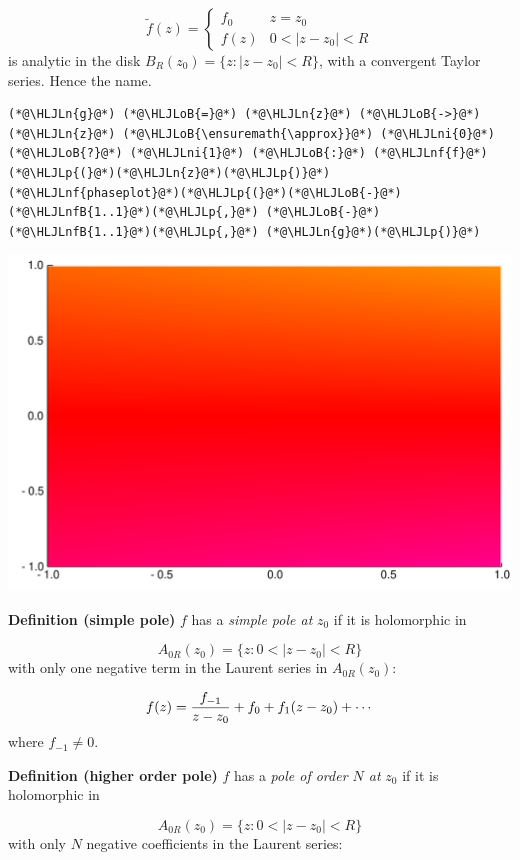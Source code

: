\documentclass[12pt,a4paper]{article}
\newcommand{\HLJLn}[1]{#1}
\newcommand{\HLJLnf}[1]{\textcolor[RGB]{66,102,213}{#1}}
\newcommand{\HLJLnfB}[1]{\textcolor[RGB]{59,151,46}{#1}}
\newcommand{\HLJLni}[1]{\textcolor[RGB]{59,151,46}{#1}}
\newcommand{\HLJLoB}[1]{\textcolor[RGB]{102,102,102}{\textbf{#1}}}
\newcommand{\HLJLp}[1]{#1}
\begin{document}
\[
\tilde f(z) = \begin{cases} f_0 & z = z_0 \\
                                f(z) & 0 < |z-z_0| < R
                                \end{cases}
\]
is analytic in the disk $B_R(z_0) = \{ z : |z-z_0| < R \}$, with a convergent Taylor series. Hence the name.


\begin{lstlisting}
(*@\HLJLn{g}@*) (*@\HLJLoB{=}@*) (*@\HLJLn{z}@*) (*@\HLJLoB{->}@*) (*@\HLJLn{z}@*) (*@\HLJLoB{\ensuremath{\approx}}@*) (*@\HLJLni{0}@*) (*@\HLJLoB{?}@*) (*@\HLJLni{1}@*) (*@\HLJLoB{:}@*) (*@\HLJLnf{f}@*)(*@\HLJLp{(}@*)(*@\HLJLn{z}@*)(*@\HLJLp{)}@*)
(*@\HLJLnf{phaseplot}@*)(*@\HLJLp{(}@*)(*@\HLJLoB{-}@*)(*@\HLJLnfB{1..1}@*)(*@\HLJLp{,}@*) (*@\HLJLoB{-}@*)(*@\HLJLnfB{1..1}@*)(*@\HLJLp{,}@*) (*@\HLJLn{g}@*)(*@\HLJLp{)}@*)
\end{lstlisting}

\includegraphics[width=\linewidth]{figures/Lecture3_3_1.pdf}

\textbf{Definition (simple pole)} $f$ has a  \emph{simple pole at} $z_0$ if it is holomorphic in 

\[
  A_{0R}(z_0) = \{z : 0 < |z - z_0| < R \}
\]
with only one negative term in the Laurent series in $A_{0R}(z_0)$:

\[
  f(z) = {f_{-1} \over z - z_0}  + f_0 + f_1 (z - z_0) + \cdots
\]
where $f_{-1} \neq 0$.

\textbf{Definition (higher order pole)} $f$ has a  \emph{pole of order $N$ at} ${z_0}$ if it is holomorphic in 

\[
 A_{0R}(z_0) = \{z : 0 < |z - z_0| < R \}
\]
with only $N$ negative coefficients in the Laurent series:
\end{document}
